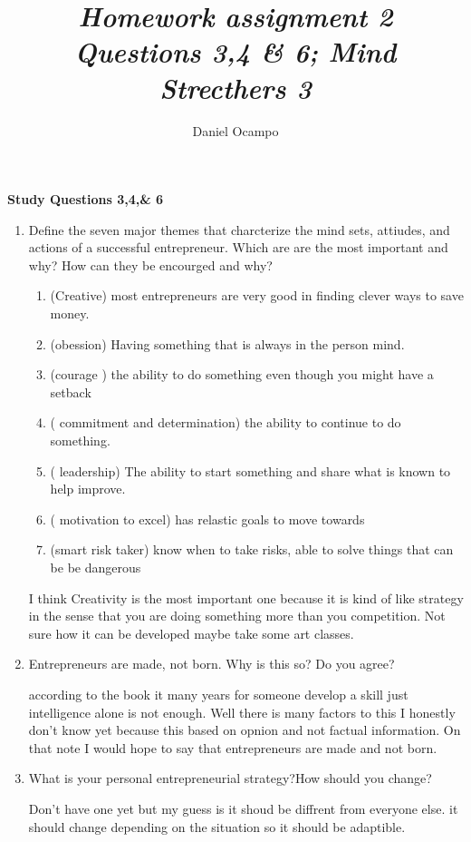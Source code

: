 \documentclass{article}
\title{\emph{ Homework assignment 2 \\
      Questions 3,4 \& 6; Mind Strecthers 3        }}
\author{Daniel Ocampo}
\begin{document}
\maketitle 
\linespread{1.0}\selectfont
\textbf{ Study Questions 3,4,\& 6}
\begin{enumerate}
\item Define the seven major themes that charcterize the mind sets, attiudes, and actions of a successful entrepreneur. Which are are the most important and why?  How can they be encourged and why?

\begin{enumerate} 
	\item (Creative) most entrepreneurs are very good in finding clever ways to save money. 
	\item (obession) Having something that is always in the person mind.
	\item (courage ) the ability to do something even though you might have a setback 
	\item ( commitment and determination)  the ability to continue to do something.
	\item ( leadership) The ability to start something and share what is known to help improve. 
	\item ( motivation to excel) has relastic goals to move towards 
	\item (smart risk taker) know when to take risks, able to solve things that can be be dangerous
\end{enumerate}  


I think Creativity is the most important one because  it is kind of like strategy in the sense that you are doing something more than you competition. Not sure how it can be developed maybe take some art classes. 

\item Entrepreneurs are made, not born. Why is this so? Do you agree? 

according to the book it many years for someone develop a skill just intelligence alone is not enough. Well there is many factors to this I honestly don't know yet because this based on opnion and not factual information. On that note I would hope to say that entrepreneurs are made and not born. 

\item What is your personal entrepreneurial strategy?How should you change?

Don't have one yet but my guess is it shoud be diffrent from everyone else. it should change depending on the situation so it should be adaptible.

\end{enumerate}
\end{document}
